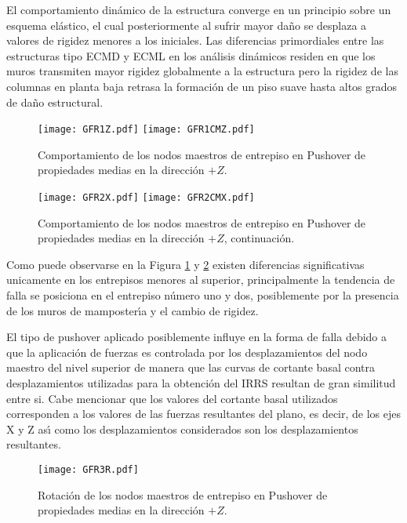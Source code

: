 \newpage

El comportamiento din\'amico de la estructura converge en un principio sobre un esquema el\'astico, el cual posteriormente al sufrir mayor da\~no se desplaza a valores de rigidez menores a los iniciales. Las diferencias primordiales entre las estructuras tipo ECMD y ECML en los an\'alisis din\'amicos residen en que los muros transmiten mayor rigidez globalmente a la estructura pero la rigidez de las columnas en planta baja retrasa la formaci\'on de un piso suave hasta altos grados de da\~no estructural.

\begin{figure} [htbp]
\texttt{[image: GFR1Z.pdf]}
\texttt{[image: GFR1CMZ.pdf]}
\caption{Comportamiento de los nodos maestros de entrepiso en Pushover de propiedades medias en la direcci\'on $+Z$.}
\label{fig:rfadnl4}
\end{figure}

\begin{figure} [htbp]
\texttt{[image: GFR2X.pdf]}
\texttt{[image: GFR2CMX.pdf]}
\caption{Comportamiento de los nodos maestros de entrepiso en Pushover de propiedades medias en la direcci\'on $+Z$, continuaci\'on.}
\label{fig:rfadnl5}
\end{figure}

\newpage

Como puede observarse en la Figura \ref{fig:rfadnl4} y \ref{fig:rfadnl5} existen diferencias significativas unicamente en los entrepisos menores al superior, principalmente la tendencia de falla se posiciona en el entrepiso n\'umero uno y dos, posiblemente por la presencia de los muros de mamposter\'{\i}a y el cambio de rigidez.

El tipo de pushover aplicado posiblemente influye en la forma de falla debido a que la aplicaci\'on de fuerzas es controlada por los desplazamientos del nodo maestro del nivel superior de manera que  las curvas de cortante basal contra desplazamientos utilizadas para la obtenci\'on del IRRS resultan de gran similitud entre si. Cabe mencionar que los valores del cortante basal utilizados corresponden a los valores de las fuerzas resultantes del plano, es decir, de los ejes X y Z as\'{\i} como los desplazamientos considerados son los desplazamientos resultantes.

\begin{figure} [htbp]
\texttt{[image: GFR3R.pdf]}
\caption{Rotaci\'on de los nodos maestros de entrepiso en Pushover de propiedades medias en la direcci\'on $+Z$.}
\label{fig:rfadnl6}
\end{figure}

